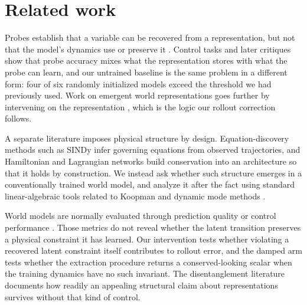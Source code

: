 \section{Related work}
\label{sec:related}

Probes establish that a variable can be recovered from a representation, but not that the model's
dynamics use or preserve it \citep{alain2017probing}. Control tasks \citep{hewitt2019control} and
later critiques \citep{belinkov2022probing} show that probe accuracy mixes what the representation
stores with what the probe can learn, and our untrained baseline is the same problem in a different
form: four of six randomly initialized models exceed the threshold we had previously used. Work on
emergent world representations goes further by intervening on the representation
\citep{li2023othello,nanda2023othello}, which is the logic our rollout correction follows.

A separate literature imposes physical structure by design. Equation-discovery methods such as SINDy
\citep{brunton2016sindy} infer governing equations from observed trajectories, and Hamiltonian and
Lagrangian networks \citep{greydanus2019hnn,cranmer2020lnn} build conservation into an architecture
so that it holds by construction. We instead ask whether such structure emerges in a conventionally
trained world model, and analyze it after the fact using standard linear-algebraic tools related to
Koopman and dynamic mode methods \citep{schmid2010dmd}.

World models are normally evaluated through prediction quality or control performance
\citep{hafner2023dreamerv3,ha2018world,schrittwieser2020muzero}. Those metrics do not reveal whether
the latent transition preserves a physical constraint it has learned. Our intervention tests whether
violating a recovered latent constraint itself contributes to rollout error, and the damped arm
tests whether the extraction procedure returns a conserved-looking scalar when the training dynamics
have no such invariant. The disentanglement literature \citep{locatello2019challenging} documents how
readily an appealing structural claim about representations survives without that kind of control.
